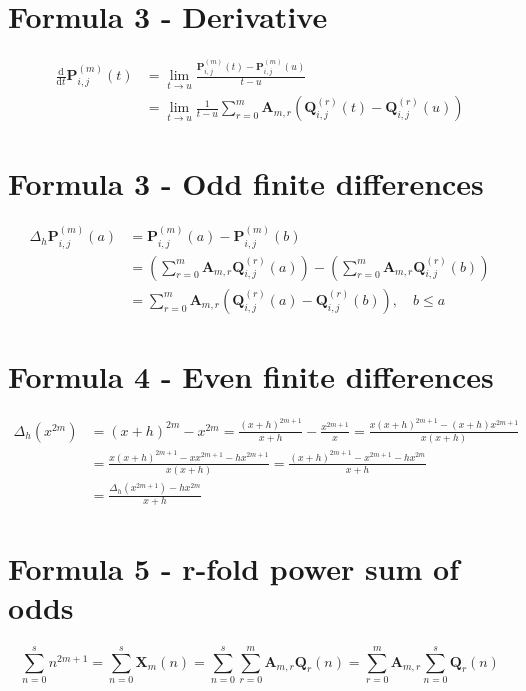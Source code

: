 \documentclass[12pt, letterpaper]{amsart}
\theoremstyle{definition}
\theoremstyle{remark}
\numberwithin{equation}{section}
\begin{document}
\section{Formula 3 - Derivative}
\begin{equation*}
\begin{split}
\frac{\mathrm{d}}{\mathrm{d}t}\mathbf{P}^{(m)}_{i,j}(t)
&=\lim\limits_{t \to u}\frac{\mathbf{P}^{(m)}_{i,j}(t)-\mathbf{P}^{(m)}_{i,j}(u)}{t-u}\\
&=\lim\limits_{t \to u}\frac{1}{t-u}\sum_{r=0}^{m} \mathbf{A}_{m,r}(\mathbf{Q}^{(r)}_{i,j}(t)-\mathbf{Q}^{(r)}_{i,j}(u))
\end{split}
\end{equation*}
\section{Formula 3 - Odd finite differences}
\begin{equation*}
\begin{split}
\Delta_h \mathbf{P}^{(m)}_{i,j}(a)
&= \mathbf{P}^{(m)}_{i,j}(a)-\mathbf{P}^{(m)}_{i,j}(b)\\
&=\left(\sum\limits_{r=0}^{m}\mathbf{A}_{m,r}\mathbf{Q}^{(r)}_{i,j}(a)\right)-\left(\sum\limits_{r=0}^{m}\mathbf{A}_{m,r}\mathbf{Q}^{(r)}_{i,j}(b)\right)\\
&=\sum_{r=0}^{m} \mathbf{A}_{m,r}(\mathbf{Q}^{(r)}_{i,j}(a)-\mathbf{Q}^{(r)}_{i,j}(b)), \quad b\leq a
\end{split}
\end{equation*}
\section{Formula 4 - Even finite differences}
\begin{equation*}
\begin{split}
\Delta_h(x^{2m})
&=(x+h)^{2m}-x^{2m}=\frac{(x+h)^{2m+1}}{x+h}-\frac{x^{2m+1}}{x}=\frac{x(x+h)^{2m+1}-(x+h)x^{2m+1}}{x(x+h)}\\
&=\frac{x(x+h)^{2m+1}-xx^{2m+1}-hx^{2m+1}}{x(x+h)}=\frac{(x+h)^{2m+1}-x^{2m+1}-hx^{2m}}{x+h}\\
&=\frac{\Delta_h(x^{2m+1})-hx^{2m}}{x+h}
\end{split}
\end{equation*}
\section{Formula 5 - r-fold power sum of odds}
\begin{equation*}
\sum_{n=0}^s n^{2m+1}=\sum_{n=0}^s\mathbf{X}_m(n)=\sum_{n=0}^s\sum_{r=0}^{m} \mathbf{A}_{m,r} \mathbf{Q}_r(n)=\sum_{r=0}^{m} \mathbf{A}_{m,r} \sum_{n=0}^s\mathbf{Q}_r(n)
\end{equation*}
\end{document}
